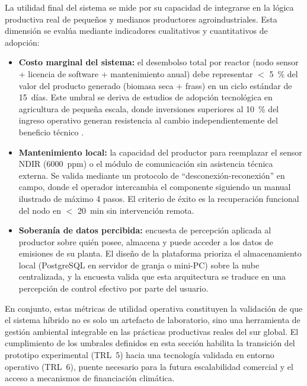 La utilidad final del sistema se mide por su capacidad de integrarse en la lógica productiva real de pequeños y medianos productores agroindustriales. Esta dimensión se evalúa mediante indicadores cualitativos y cuantitativos de adopción:

\begin{itemize}
    \item \textbf{Costo marginal del sistema:} el desembolso total por reactor (nodo sensor + licencia de software + mantenimiento anual) debe representar $<$ \num{5}~\% del valor del producto generado (biomasa seca + frass) en un ciclo estándar de \num{15}~días. Este umbral se deriva de estudios de adopción tecnológica en agricultura de pequeña escala, donde inversiones superiores al \num{10}~\% del ingreso operativo generan resistencia al cambio independientemente del beneficio técnico \parencite{fawzyStrategiesMitigationClimate2020}.
    
    \item \textbf{Mantenimiento local:} la capacidad del productor para reemplazar el sensor NDIR (\num{6000}~ppm) o el módulo de comunicación sin asistencia técnica externa. Se valida mediante un protocolo de ``desconexión-reconexión'' en campo, donde el operador intercambia el componente siguiendo un manual ilustrado de máximo \num{4} pasos. El criterio de éxito es la recuperación funcional del nodo en $<$ \num{20}~min sin intervención remota.
    
    \item \textbf{Soberanía de datos percibida:} encuesta de percepción aplicada al productor sobre quién posee, almacena y puede acceder a los datos de emisiones de su planta. El diseño de la plataforma prioriza el almacenamiento local (PostgreSQL en servidor de granja o mini-PC) sobre la nube centralizada, y la encuesta valida que esta arquitectura se traduce en una percepción de control efectivo por parte del usuario.
\end{itemize}

En conjunto, estas métricas de utilidad operativa constituyen la validación de que el sistema híbrido no es solo un artefacto de laboratorio, sino una herramienta de gestión ambiental integrable en las prácticas productivas reales del sur global. El cumplimiento de los umbrales definidos en esta sección habilita la transición del prototipo experimental (TRL~5) hacia una tecnología validada en entorno operativo (TRL~6), puente necesario para la futura escalabilidad comercial y el acceso a mecanismos de financiación climática.
